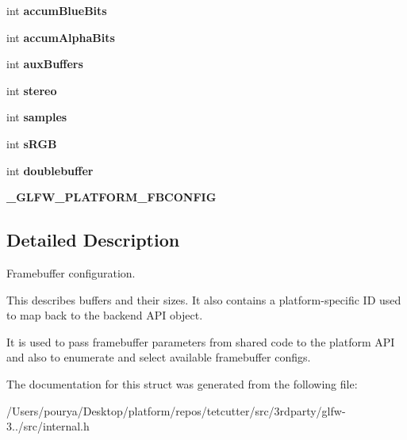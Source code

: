 \begin{DoxyCompactItemize}
\item 
\hypertarget{struct__GLFWfbconfig_a1628cb7857d3fd6d4967ddbc16f57445}{}int {\bfseries accum\+Blue\+Bits}\label{struct__GLFWfbconfig_a1628cb7857d3fd6d4967ddbc16f57445}

\item 
\hypertarget{struct__GLFWfbconfig_a88d9b62bc1c4c4fb411ff2d980ef08e2}{}int {\bfseries accum\+Alpha\+Bits}\label{struct__GLFWfbconfig_a88d9b62bc1c4c4fb411ff2d980ef08e2}

\item 
\hypertarget{struct__GLFWfbconfig_a1ad8a70d25f8c39ee51365fdae9de7ff}{}int {\bfseries aux\+Buffers}\label{struct__GLFWfbconfig_a1ad8a70d25f8c39ee51365fdae9de7ff}

\item 
\hypertarget{struct__GLFWfbconfig_aece635920b57a862db006201dc190a17}{}int {\bfseries stereo}\label{struct__GLFWfbconfig_aece635920b57a862db006201dc190a17}

\item 
\hypertarget{struct__GLFWfbconfig_aa6a57ca77268a4851f5c2be7e330cf5d}{}int {\bfseries samples}\label{struct__GLFWfbconfig_aa6a57ca77268a4851f5c2be7e330cf5d}

\item 
\hypertarget{struct__GLFWfbconfig_af0cbcff20dda6b1edf837cfb1de76b15}{}int {\bfseries s\+R\+G\+B}\label{struct__GLFWfbconfig_af0cbcff20dda6b1edf837cfb1de76b15}

\item 
\hypertarget{struct__GLFWfbconfig_afd11a8b89b5e2fdbaf0f7f55999671c0}{}int {\bfseries doublebuffer}\label{struct__GLFWfbconfig_afd11a8b89b5e2fdbaf0f7f55999671c0}

\item 
\hypertarget{struct__GLFWfbconfig_ac564adcf627f2f558385f66161b96756}{}{\bfseries \+\_\+\+G\+L\+F\+W\+\_\+\+P\+L\+A\+T\+F\+O\+R\+M\+\_\+\+F\+B\+C\+O\+N\+F\+I\+G}\label{struct__GLFWfbconfig_ac564adcf627f2f558385f66161b96756}

\end{DoxyCompactItemize}


\subsection{Detailed Description}
Framebuffer configuration. 

This describes buffers and their sizes. It also contains a platform-\/specific I\+D used to map back to the backend A\+P\+I object.

It is used to pass framebuffer parameters from shared code to the platform A\+P\+I and also to enumerate and select available framebuffer configs. 

The documentation for this struct was generated from the following file\+:\begin{DoxyCompactItemize}
\item 
/\+Users/pourya/\+Desktop/platform/repos/tetcutter/src/3rdparty/glfw-\/3../src/internal.\+h\end{DoxyCompactItemize}
